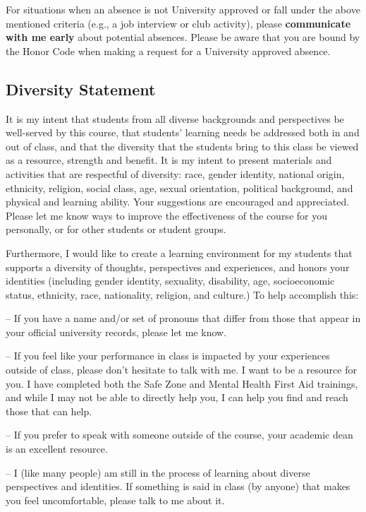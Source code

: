\documentclass[11pt,]{article}
\begin{document}
For situations when an absence is not University approved or fall under
the above mentioned criteria (e.g., a job interview or club activity),
please \textbf{communicate with me early} about potential absences.
Please be aware that you are bound by the Honor Code when making a
request for a University approved absence.

\hypertarget{diversity-statement}{%
\subsection{Diversity Statement}\label{diversity-statement}}

It is my intent that students from all diverse backgrounds and
perspectives be well-served by this course, that students' learning
needs be addressed both in and out of class, and that the diversity that
the students bring to this class be viewed as a resource, strength and
benefit. It is my intent to present materials and activities that are
respectful of diversity: race, gender identity, national origin,
ethnicity, religion, social class, age, sexual orientation, political
background, and physical and learning ability. Your suggestions are
encouraged and appreciated. Please let me know ways to improve the
effectiveness of the course for you personally, or for other students or
student groups.

Furthermore, I would like to create a learning environment for my
students that supports a diversity of thoughts, perspectives and
experiences, and honors your identities (including gender identity,
sexuality, disability, age, socioeconomic status, ethnicity, race,
nationality, religion, and culture.) To help accomplish this:

-- If you have a name and/or set of pronouns that differ from those that
appear in your official university records, please let me know.

-- If you feel like your performance in class is impacted by your
experiences outside of class, please don't hesitate to talk with me. I
want to be a resource for you. I have completed both the Safe Zone and
Mental Health First Aid trainings, and while I may not be able to
directly help you, I can help you find and reach those that can help.

-- If you prefer to speak with someone outside of the course, your
academic dean is an excellent resource.

-- I (like many people) am still in the process of learning about
diverse perspectives and identities. If something is said in class (by
anyone) that makes you feel uncomfortable, please talk to me about it.
\end{document}
